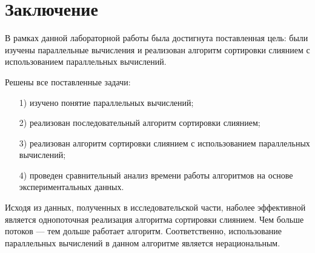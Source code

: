 {\center\chapter*{Заключение}}

В рамках данной лабораторной работы была достигнута поставленная цель: были изучены параллельные вычисления и реализован алгоритм сортировки слиянием с использованием параллельных вычислений.

Решены все поставленные задачи:

\begin{enumerate}
\item[1)]
изучено понятие параллельных вычислений;
\item[2)]
реализован последовательный алгоритм сортировки слиянием;
\item[3)]
реализован алгоритм сортировки слиянием с использованием параллельных вычислений;
\item[4)]
проведен сравнительный анализ времени работы алгоритмов на основе экспериментальных данных.
\end{enumerate}

Исходя из данных, полученных в исследовательской части, наболее эффективной является однопоточная реализация алгоритма сортировки слиянием. 
Чем больше потоков --- тем дольше работает алгоритм. 
Соответственно, использование параллельных вычислений в данном алгоритме является нерациональным.
